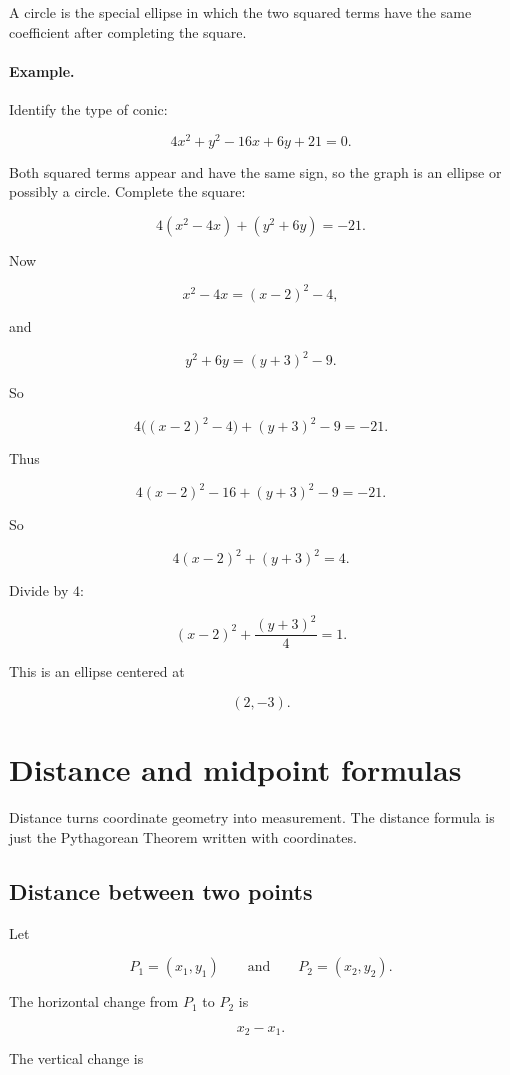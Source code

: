 A circle is the special ellipse in which the two squared terms have the same
coefficient after completing the square.

\paragraph{Example.}
Identify the type of conic:

\[
4x^2+y^2-16x+6y+21=0.
\]

Both squared terms appear and have the same sign, so the graph is an ellipse or
possibly a circle.  Complete the square:

\[
4(x^2-4x)+(y^2+6y)=-21.
\]

Now

\[
x^2-4x=(x-2)^2-4,
\]

and

\[
y^2+6y=(y+3)^2-9.
\]

So

\[
4\bigl((x-2)^2-4\bigr)+(y+3)^2-9=-21.
\]

Thus

\[
4(x-2)^2-16+(y+3)^2-9=-21.
\]

So

\[
4(x-2)^2+(y+3)^2=4.
\]

Divide by \(4\):

\[
\boxed{
(x-2)^2+\frac{(y+3)^2}{4}=1.
}
\]

This is an ellipse centered at

\[
(2,-3).
\]

\section{Distance and midpoint formulas}
\label{appsec:distance-midpoint}

Distance turns coordinate geometry into measurement.  The distance formula is just
the Pythagorean Theorem written with coordinates.

\subsection{Distance between two points}
\label{appsubsec:distance-between-points}

Let

\[
P_1=(x_1,y_1)
\qquad\text{and}\qquad
P_2=(x_2,y_2).
\]

The horizontal change from \(P_1\) to \(P_2\) is

\[
x_2-x_1.
\]

The vertical change is

